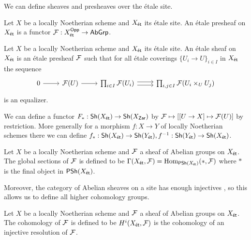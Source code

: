 We can define sheaves and presheaves over the \'{e}tale site. 
\begin{definition}\label{def: etale presheaves}
    Let $X$ be a locally Noetherian scheme and $X_{\mathsf{\acute{e}t}}$ its \'{e}tale site. An \'{e}tale presheaf on $X_{\mathsf{\acute{e}t}}$ is a functor $\mathcal{F}:X_{\mathsf{\acute{e}t}}^{\mathsf{Opp}}\to\mathsf{AbGrp}$. 
\end{definition}
\begin{definition}\label{def: etale sheaves}
    Let $X$ be a locally Noetherian scheme and $X_{\mathsf{\acute{e}t}}$ its \'{e}tale site. An \'{e}tale sheaf on $X_{\mathsf{\acute{e}t}}$ is an \'{e}tale presheaf $\mathcal{F}$ such that for all \'{e}tale coverings $\{U_{i}\to U\}_{i\in I}$ in $X_{\mathsf{\acute{e}t}}$ the sequence 
    $$%
    \begin{tikzcd}
        0 & {\Fcal(U)} & {\prod_{i\in I}\Fcal(U_{i})} & {\prod_{i,j\in I}\Fcal(U_{i}\times_{U}U_{j})}
        \arrow[from=1-1, to=1-2]
        \arrow[from=1-2, to=1-3]
        \arrow[shift left, from=1-3, to=1-4]
        \arrow[shift right, from=1-3, to=1-4]
    \end{tikzcd}$$
    is an equalizer. 
\end{definition}
We can define a functor $F_{*}:\mathsf{Sh}(X_{\mathsf{\acute{e}t}})\to\mathsf{Sh}(X_{\mathsf{Zar}})$ by $\mathcal{F}\mapsto[[U\to X]\mapsto\mathcal{F}(U)]$ by restriction. More generally for a morphism $f:X\to Y$ of locally Noetherian schemes there we can define $f_{*}:\mathsf{Sh}(X_{\mathsf{\acute{e}t}})\to \mathsf{Sh}(Y_{\mathsf{\acute{e}t}}),f^{-1}:\mathsf{Sh}(Y_{\mathsf{\acute{e}t}})\to\mathsf{Sh}(X_{\mathsf{\acute{e}t}})$. 
\begin{definition}\label{def: global sections of etale sheaves}
    Let $X$ be a locally Noetherian scheme and $\mathcal{F}$ a sheaf of Abelian groups on $X_{\mathsf{\acute{e}t}}$. The global sections of $\mathcal{F}$ is defined to be $\Gamma(X_{\mathsf{\acute{e}t}},\mathcal{F})=\mathrm{Hom}_{\mathsf{PSh}(X_{\mathsf{\acute{e}t}})}(*,\mathcal{F})$ where $*$ is the final object in $\mathsf{PSh}(X_{\mathsf{\acute{e}t}})$. 
\end{definition}
Moreover, the category of Abelian sheaves on a site has enough injectives \cite[\href{https://stacks.math.columbia.edu/tag/01DL}{Tag 01DL}]{stacks-project}, so this allows us to define all higher cohomology groups. 
\begin{definition}\label{def: global sections of etale sheaves}
    Let $X$ be a locally Noetherian scheme and $\mathcal{F}$ a sheaf of Abelian groups on $X_{\mathsf{\acute{e}t}}$. The cohomology of $\mathcal{F}$ is defined to be $H^{i}(X_{\mathsf{\acute{e}t}},\mathcal{F})$ is the cohomology of an injective resolution of $\mathcal{F}$.  
\end{definition}
